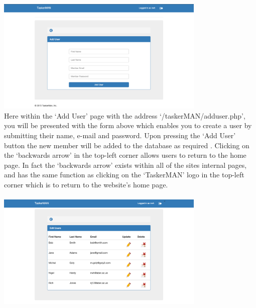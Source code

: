 \documentclass{project}
\begin{document}
\newline
\includegraphics[width=0.75\textwidth, center]{images/5.2/TaskerMANAddUser} \\
Here within the `Add User' page with the address `/taskerMAN/adduser.php', you will be presented with the form above which enables you to create a user by submitting their name, e-mail and password. Upon pressing the `Add User' button the new member will be added to the database as required \cite{se.qa.rs}. Clicking on the `backwards arrow' in the top-left corner allows users to return to the home page. In fact the `backwards arrow' exists within all of the sites internal pages, and has the same function as clicking on the `TaskerMAN' logo in the top-left corner which is to return to the website's home page.\\~\\
\newline
\includegraphics[width=0.75\textwidth, center]{images/5.2/TaskerMANEditUser} \\
\end{document}
